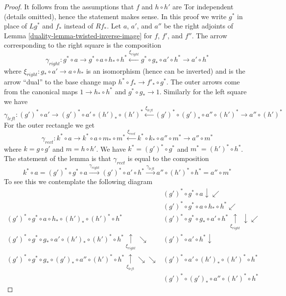\begin{proof}

It follows from the assumptions that $f$ and $h \circ h'$ are Tor
independent (details omitted), hence the statement makes sense.
In this proof we write $g^*$ in place of $Lg^*$ and $f_*$ instead
of $Rf_*$. Let $a$, $a'$, and $a''$ be the right adjoints of
Lemma \ref{duality-lemma-twisted-inverse-image}
for $f$, $f'$, and $f''$. The arrow corresponding to the right
square is the composition
$$
\gamma_{right} :
g^* \circ a \to g^* \circ a \circ h_* \circ h^*
\xleftarrow{\xi_{right}} g^* \circ g_* \circ a' \circ h^* \to a' \circ h^*
$$
where $\xi_{right} : g_* \circ a' \to a \circ h_*$
is an isomorphism (hence can be inverted)
and is the arrow ``dual'' to the base change map
$h^* \circ f_* \to f'_* \circ g^*$. The outer arrows come
from the canonical maps $1 \to h_* \circ h^*$ and $g^* \circ g_* \to 1$.
Similarly for the left square we have
$$
\gamma_{left} :
(g')^* \circ a' \to (g')^* \circ a' \circ (h')_* \circ (h')^*
\xleftarrow{\xi_{left}}
(g')^* \circ (g')_* \circ a'' \circ (h')^* \to a'' \circ (h')^*
$$
For the outer rectangle we get
$$
\gamma_{rect} :
k^* \circ a \to
k^* \circ a \circ m_* \circ m^* \xleftarrow{\xi_{rect}}
k^* \circ k_* \circ a'' \circ m^* \to
a'' \circ m^*
$$
where $k = g \circ g'$ and $m = h \circ h'$.
We have $k^* = (g')^* \circ g^*$ and $m^* = (h')^* \circ h^*$.
The statement of the lemma is that $\gamma_{rect}$
is equal to the composition
$$
k^* \circ a =
(g')^* \circ g^* \circ a \xrightarrow{\gamma_{right}}
(g')^* \circ a' \circ h^* \xrightarrow{\gamma_{left}}
a'' \circ (h')^* \circ h^* = a'' \circ m^*
$$
To see this we contemplate the following diagram
$$
\begin{array}{cc} & (g')^* \circ g^* \circ a \downarrow\swarrow \\  & (g')^* \circ g^* \circ a \circ h_* \circ h^* \swarrow \\ (g')^* \circ g^* \circ a \circ h_* \circ (h')_* \circ (h')^* \circ h^* & (g')^* \circ g^* \circ g_* \circ a' \circ h^*
\underset{\xi_{right}}{\uparrow}\downarrow\swarrow \\ (g')^* \circ g^* \circ g_* \circ a' \circ (h')_* \circ (h')^* \circ h^*
\underset{\xi_{right}}{\uparrow}\searrow & (g')^* \circ a' \circ h^* \downarrow \\ (g')^* \circ g^* \circ g_* \circ (g')_* \circ a'' \circ (h')^* \circ h^*
\underset{\xi_{left}}{\uparrow}\searrow\searrow & (g')^* \circ a' \circ (h')_* \circ (h')^* \circ h^* \\  & (g')^*\circ (g')_* \circ a'' \circ (h')^* \circ h^*

\end{array}$$
\end{proof}
